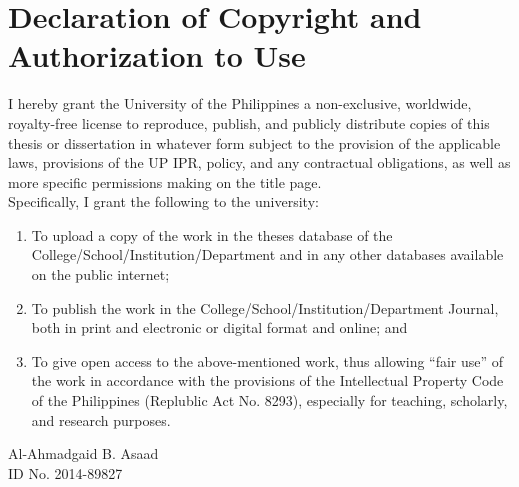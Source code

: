 \chapter*{Declaration of Copyright and Authorization to Use}
\label{ch:copyright}
I hereby grant the University of the Philippines a non-exclusive, worldwide, royalty-free license to reproduce, publish, and publicly distribute copies of this thesis or dissertation in whatever form subject to the provision of the applicable laws, provisions of the UP IPR, policy, and any contractual obligations, as well as more specific permissions making on the title page.\\[-0.2cm]

\noindent Specifically, I grant the following to the university:
\begin{enumerate}
    \item To upload a copy of the work in the theses database of the College/School/Institution/Department and in any other databases available on the public internet;

    \item To publish the work in the College/School/Institution/Department Journal, both in print and electronic or digital format and online; and
    
    \item To give open access to the above-mentioned work, thus allowing “fair use” of the work in accordance with the provisions of the Intellectual Property Code of the Philippines (Replublic Act No. 8293), especially for teaching, scholarly, and research purposes.
\end{enumerate}
\vspace{2cm}
\begin{flushright}
    Al-Ahmadgaid B. Asaad\\
    ID No. 2014-89827
\end{flushright}
